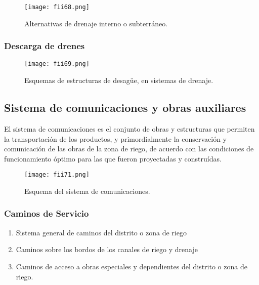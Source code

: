 \begin{figure}[h!]
	\centerline{\texttt{[image: fii68.png]}}
	\caption{Alternativas de drenaje interno o subterráneo.}
	\label{fii68}
\end{figure}

\subsubsection{Descarga de drenes}

\begin{figure}[h!]
	\centerline{\texttt{[image: fii69.png]}}
	\caption{Esquemas de estructuras de desagüe, en sistemas de drenaje.}
	\label{fii69}
\end{figure}

\subsection{Sistema de comunicaciones y obras auxiliares}

\begin{definition}
	El sistema de comunicaciones es el conjunto de obras y estructuras que permiten
	la transportación de los productos, y primordialmente la conservación y comunicación
	de las obras de la zona de riego, de acuerdo con las condiciones de funcionamiento
	óptimo para las que fueron proyectadas y construídas.
\end{definition}

\begin{figure}[h!]
	\centerline{\texttt{[image: fii71.png]}}
	\caption{Esquema del sistema de comunicaciones.}
	\label{fii71}
\end{figure}

\subsubsection{Caminos de Servicio}

\begin{enumerate}
	\item Sistema general de caminos del distrito o zona de riego
	\item Caminos sobre los bordos de los canales de riego y drenaje
	\item Caminos de acceso a obras especiales y dependientes del distrito o zona de riego.
\end{enumerate}


